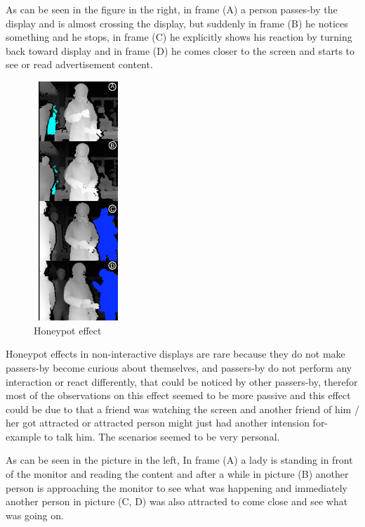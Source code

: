As can be seen in the figure in the right, in frame (A) a person passes-by the display and is almost crossing the display, but suddenly in frame (B) he notices something and he stops, in frame (C) he explicitly shows his reaction by turning back toward display and in frame (D) he comes closer to the screen and starts to see or read advertisement content. \\


\begin{figure}
  \vspace{-20pt}
  \begin{center}
    \includegraphics[width=0.30\textwidth,height=90mm]{figures/8/non_inter_findings/effects/honeypot}
  \end{center}
  \vspace{-20pt}
  \caption{Honeypot effect}
  \vspace{-60pt}
\end{figure}
Honeypot\cite{LookingGlass} effects in non-interactive displays are rare because they do not make passers-by become curious about themselves, and passers-by do not perform any interaction or react differently, that could be noticed by other passers-by, therefor most of the observations on this effect seemed to be more passive and this effect could be due to that a friend was watching the screen and another friend of him / her got attracted or attracted person might just had another intension for-example to talk him. The scenarios seemed to be very personal.

As can be seen in the picture in the left, In frame (A) a lady is standing in front of the monitor and reading the content and after a while in picture (B) another person is approaching the monitor to see what was happening and immediately another person in picture (C, D) was also attracted to come close and see what was going on. 



